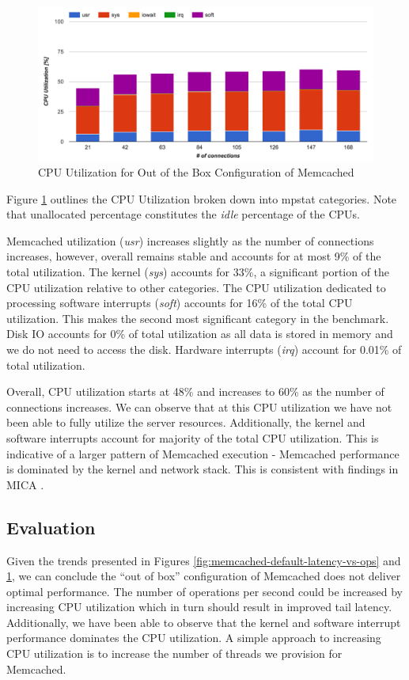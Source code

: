\begin{figure}[h]
    \includegraphics[width=\textwidth]{./res2/m_baseline_cpu.png}
    \caption{CPU Utilization for Out of the Box Configuration of Memcached}
    \label{fig:m_baseline_cpu}
\end{figure}

Figure \ref{fig:m_baseline_cpu} outlines the CPU Utilization broken down into mpstat categories. Note that unallocated percentage constitutes the \textit{idle} percentage of the CPUs.

Memcached utilization (\textit{usr}) increases slightly as the number of connections increases, however, overall remains stable and accounts for at most 9\% of the total utilization. The kernel (\textit{sys}) accounts for 33\%, a significant portion of the CPU utilization relative to other categories. The CPU utilization dedicated to processing software interrupts (\textit{soft}) accounts for 16\% of the total CPU utilization. This makes the second most significant category in the benchmark. Disk IO accounts for 0\% of total utilization as all data is stored in memory and we do not need to access the disk. Hardware interrupts (\textit{irq}) account for 0.01\% of total utilization.

Overall, CPU utilization starts at 48\% and increases to 60\% as the number of connections increases. We can observe that at this CPU utilization we have not been able to fully utilize the server resources. Additionally, the kernel and software interrupts account for majority of the total CPU utilization. This is indicative of a larger pattern of Memcached execution - Memcached performance is dominated by the kernel and network stack. This is consistent with findings in MICA \cite{lim2014mica}.


\subsection{Evaluation}
Given the trends presented in Figures \ref{fig:memcached-default-latency-vs-ops} and \ref{fig:m_baseline_cpu}, we can conclude the ``out of box'' configuration of Memcached does not deliver optimal performance. The number of operations per second could be increased by increasing CPU utilization which in turn  should result in improved tail latency. Additionally, we have been able to observe that the kernel and software interrupt performance dominates the CPU utilization. A simple approach to increasing CPU utilization is to increase the number of threads we provision for Memcached.

